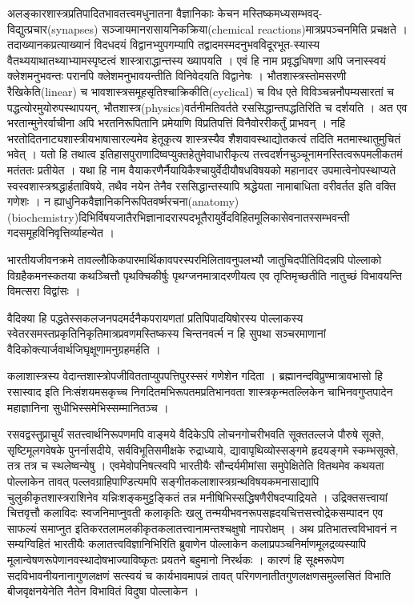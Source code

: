 {\dev अलङ्कारशास्त्रप्रतिपादितभावतत्त्वमधुनातना वैज्ञानिकाः केचन मस्तिष्कमध्यसम्भवद्-विद्यु\-त्प्रचार}(synapses) {\dev सञ्जायमानरासायनिकक्रिया}(chemical reactions){\dev मात्रप्रपञ्चनमिति प्रचक्षते । तदाख्यानकप्रत्याख्यानं विदधदयं विद्वानभ्युपगम्यापि तद्वादमस्मदनुभवविदूरभूत-\break\-स्यास्य वैतथ्ययाथातथ्याभ्यामस्पृष्टत्वं शास्त्राराद्धा\-न्तस्य ख्यापयति । एवं हि नाम प्रवृद्धधिषणा अपि जनास्स्वयं क्लेशमनुभवन्तः परानपि क्लेशमनुभावयन्तीति विनिवेदयति विद्वानेषः । भौत\-शास्त्रस्तोमसरणी रैखिकेति}(linear) {\dev च भावशास्त्र\-समूहसृतिश्चाक्रिकीति}(cyclical) {\dev च विध एते विविञ्चन्ननौपम्यसारतां च पद्धत्योरमुयोरुपस्थापयन्, भौतशास्त्र}(physics){\dev वर्तनीमति\-वर्तते रससिद्धान्तपद्धतिरिति च दर्शयति । अत एव भरतान्मुनेरर्वाचीना अपि भरतनिरूपितानि प्रमेयाणि विप्रतिपत्तिं विनैवोररीकर्तुं प्राभवन् । नहि भरतोदितनाट्य\-शास्त्रीयभाषासारल्यमेव हेतूकृत्य शास्त्रस्यैव शैशवावस्थाद्योतकत्वं तदिति मतमास्थातुमुचितं भवेत् । यतो हि तथात्व इतिहासपुराणादिष्वप्युक्तहेतुमेवाधारीकृत्य तत्त्वदर्शनचुञ्चूनामनस्ति\-त्वरूपमलीकतमं मतं\break ततः प्रती\-येत । यथा हि नाम वैयाकरणैर्नैयायिकैश्चायुर्वेदीयौषधविषयको महानादर उपमात्वे\-नोपस्थाप्यते स्वस्वशास्त्रश्रद्धार्हताविषये, तथैव नयेन तेनैव रससिद्धान्तस्यापि श्रद्धेयता नामा\-बाधिता वरीवर्तत इति वक्ति गणेशः । न ह्याधुनिकवैज्ञानिकनिरूपितवर्ष्मरचना}(anatomy)(biochemistry){\dev दिभिर्विषयजातैरभिज्ञानादरास्पदभूतैरायु\-र्वेद\-विहित\-मूलिका\-सेवनातस्सम्भवन्ती गदसमूहविनिवृत्तिर्व्याहन्येत ।}

{\dev भारतीयजीवनक्रमे तावल्लौकिकपारमार्थिकावपरस्परमिलितावनुपलभ्यौ जातुचिदपीति\break विदन्नपि पोल्लाको विग्रहैकमनस्कतया कथञ्चित्तौ पृथक्चिकीर्षुः पृथग्जनमात्रादरणीयत्व एव तृप्तिमृच्छतीति नातुच्छं विभावयन्ति विमत्सरा विद्वांसः ।}

{\dev वैदिक्या हि पद्धतेस्सकलजनपदमर्दनैकपरायणतां प्रतिपिपादयिषोरस्य पोल्लाकस्य स्वेतर\-समस्तप्रकृतिनिकृतिमात्रप्रवणमस्तिष्कस्य चिन्तनवर्त्म न हि सुपथा सञ्चरमाणानां वैदिको\-क्त्यार्जवार्थजिघृक्षूणामनुग्रहमर्हति ।}

{\dev कलाशास्त्रस्य वेदान्तशास्त्रोपजीवितताप्युपपत्तिपुरस्सरं गणेशेन गदिता । ब्रह्मानन्दविप्रुण्मा\-त्रावभासो हि रसास्वाद इति निःसंशयमसकृच्च निगदितमभिरूपतमप्रतिभानवता शास्त्रकृन्मत\-ल्लिकेन चाभिनवगुप्तपादेन महाज्ञानिना सुधीभिस्समेभिस्सम्मानितञ्च ।}

{\dev रसवद्वस्तुप्राचुर्यं सतत्त्वार्थनिरूपणमपि वाङ्मये वैदिकेऽपि लोचनगोचरीभवति सूक्ततल्लजे पौरुषे सूक्ते, सृष्टिमूलगवेषके पुनर्नासदीये, सर्वविभूतिसमीक्षके रुद्राध्याये, द्यावापृथिव्योस्स\-ङ्गमे हृदयङ्गमे स्कम्भसूक्ते, तत्र तत्र च स्थलेष्वन्येषु । एवमेवोपनिषत्स्वपि भारतीयैः सौन्दर्य\-मीमांसा समुपेक्षितेति वितथमेव कथयता पोल्लाकेन तावत् पल्लवग्राहिपाण्डित्यमपि  सङ्गीतकलाशास्त्रग्रन्थविषयकमनासाद्यापि चुलुकीकृतशास्त्रराशिनेव यन्निःशङ्कमुट्टङ्कितं तन्न मनीषिभिस्सद्धिषणैरीषदप्याद्रियते । उद्रिक्तसत्त्वायां चित्तवृत्तौ कलाविदः स्वजनिमाप्नुवती कलाकृतिः खलु तन्मयीभवनरूपसहृदयचित्तसत्त्वोद्रेकसम्पादन एव साफल्यं समाप्नुत इति\break करतलामलकीकृतकलातत्त्वानामन्तश्चक्षुषो नापरोक्षम् । अथ प्रतिभातत्त्वविभावनं न सम्य\-ग्विहितं भारतीयैः कलातत्त्वविज्ञानिभिरिति ब्रुवाणेन पोल्लाकेन कलाप्रपञ्चनिर्माणमूलद्रव्य\-स्यापि मूलान्वेषणरूपेणानवस्थादोषभाज्याविष्कृतः प्रयतने बहुमानो निरर्थकः । कारणं हि सूक्ष्मरूपेण सदविभावनीयनानागुणलक्षणं सत्स्वयं च कार्यभावमापन्नं तावत् परिगणनातीत\-गुणलक्षणसमुल्लसितं विभाति बीजवृक्षनयेनेति नैतेन विभावितं विदुषा पोल्लाकेन ।}

